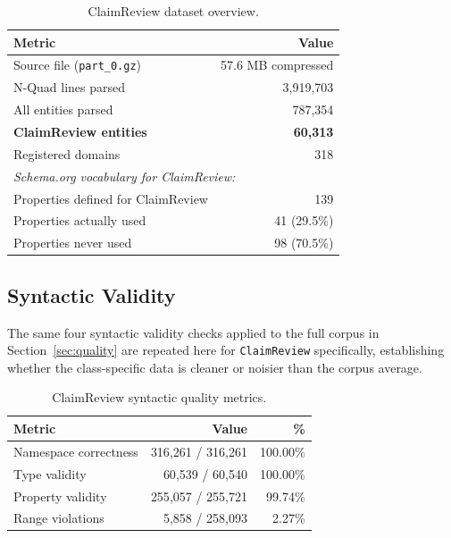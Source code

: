 \documentclass[11pt,a4paper]{article}
\begin{document}
\begin{table}[H]
\centering
\caption{ClaimReview dataset overview.}
\label{tab:cr_dataset}
\begin{tabular}{lr}
\toprule
\textbf{Metric} & \textbf{Value} \\
\midrule
Source file (\texttt{part\_0.gz}) & 57.6 MB compressed \\
N-Quad lines parsed & 3{,}919{,}703 \\
All entities parsed & 787{,}354 \\
\textbf{ClaimReview entities} & \textbf{60{,}313} \\
Registered domains & 318 \\
\midrule
\multicolumn{2}{l}{\small\itshape Schema.org vocabulary for ClaimReview:} \\
Properties defined for ClaimReview & 139 \\
Properties actually used & 41 (29.5\%) \\
Properties never used & 98 (70.5\%) \\
\bottomrule
\end{tabular}
\end{table}


\subsection{Syntactic Validity}

The same four syntactic validity checks applied to the full corpus in
Section~\ref{sec:quality} are repeated here for \texttt{ClaimReview}
specifically, establishing whether the class-specific data is cleaner or
noisier than the corpus average.

\begin{table}[H]
\centering
\caption{ClaimReview syntactic quality metrics.}
\label{tab:cr_quality}
\begin{tabular}{lrr}
\toprule
\textbf{Metric} & \textbf{Value} & \textbf{\%} \\
\midrule
Namespace correctness  & 316{,}261 / 316{,}261 & 100.00\% \\
Type validity          &  60{,}539 /  60{,}540 & 100.00\% \\
Property validity      & 255{,}057 / 255{,}721 & 99.74\% \\
Range violations       &   5{,}858 / 258{,}093 &  2.27\% \\
\bottomrule
\end{tabular}
\end{table}
\end{document}
